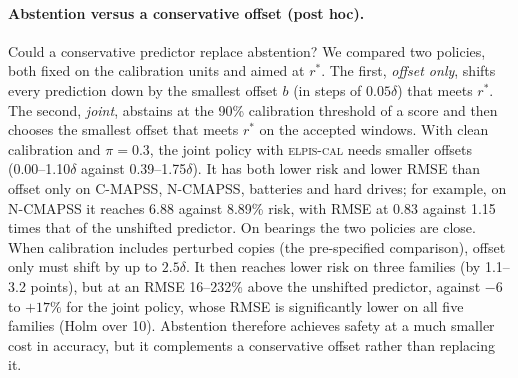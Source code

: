 \documentclass{esannV2}
\newcommand{\AUTO}{\textsc{elpis-cal}}
\begin{document}
\paragraph{Abstention versus a conservative offset (post hoc).} Could a conservative predictor replace abstention? We compared two policies, both fixed on the calibration units and aimed at $r^\ast$. The first, \emph{offset only}, shifts every prediction down by the smallest offset $b$ (in steps of $0.05\delta$) that meets $r^\ast$. The second, \emph{joint}, abstains at the 90\% calibration threshold of a score and then chooses the smallest offset that meets $r^\ast$ on the accepted windows. With clean calibration and $\pi=0.3$, the joint policy with \AUTO{} needs smaller offsets (0.00--1.10$\delta$ against 0.39--1.75$\delta$). It has both lower risk and lower RMSE than offset only on C-MAPSS, N-CMAPSS, batteries and hard drives; for example, on N-CMAPSS it reaches 6.88 against 8.89\% risk, with RMSE at 0.83 against 1.15 times that of the unshifted predictor. On bearings the two policies are close. When calibration includes perturbed copies (the pre-specified comparison), offset only must shift by up to $2.5\delta$. It then reaches lower risk on three families (by 1.1--3.2 points), but at an RMSE 16--232\% above the unshifted predictor, against $-6$ to $+17\%$ for the joint policy, whose RMSE is significantly lower on all five families (Holm over 10). Abstention therefore achieves safety at a much smaller cost in accuracy, but it complements a conservative offset rather than replacing it.




\FloatBarrier
\begin{footnotesize}


\end{footnotesize}
\end{document}
